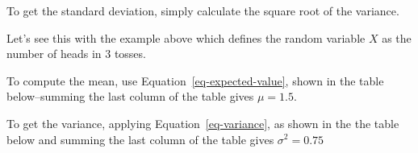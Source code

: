 \documentclass[
  letterpaper,
  DIV=11,
  numbers=noendperiod]{scrreprt}
\begin{document}
To get the standard deviation, simply calculate the square root of the
variance.

Let's see this with the example above which defines the random variable
\(X\) as the number of heads in 3 tosses.

To compute the mean, use Equation~\ref{eq-expected-value}, shown in the
table below--summing the last column of the table gives \(\mu = 1.5\).

\begin{table}

\caption{\label{tbl-mean}Calculating the mean.}

\centering{

\[
\begin{array}{|c|c|c|}
\hline
X & P(X) & X \cdot P(X) \\
\hline
0 & 1/8 & 0 \\
1 & 3/8 & 3/8 \\
2 & 3/8 & 6/8 \\
3 & 1/8 & 3/8 \\
\hline
\textbf{Total} & \mathbf{1} & \mathbf{12/8 = 1.5} \\
\hline
\end{array}
\]

}

\end{table}%

To get the variance, applying Equation~\ref{eq-variance}, as shown in
the the table below and summing the last column of the table gives
\(\sigma^2 = 0.75\)

\begin{table}

\caption{\label{tbl-variance}Calculating the variance.}

\centering{

\[
\begin{array}{|c|c|c|c|}
\hline
X & P(X) & (X_i - \mu) & (X_i - \mu)^2 \cdot P(X) \\
\hline
0 & 0.125 & -1.5 & 0.28125 \\
1 & 0.375 & -0.5 & 0.09375 \\
2 & 0.375 & 0.5 & 0.09375 \\
3 & 0.125 & 1.5 & 0.28125 \\
\hline
\mathbf{\Sigma} & \mathbf{1.000} & & \sigma^2 = \mathbf{0.75} \\
\hline
\end{array}
\]

}

\end{table}%
\end{document}
